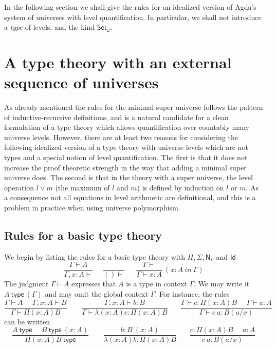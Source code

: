 \documentclass[11pt,a4paper]{article}
\newcommand{\Id}{\mathsf{Id}}
\newcommand{\type}{\mathsf{type}}
\newcommand{\N}{\mathsf{N}}
\newcommand{\Set}{\mathsf{Set}}
\begin{document}
In the following section we shall give the rules for an idealized version of Agda's system of universes with level quantification. In particular, we shall not introduce a {\em type} of levels, and the kind $\Set_\omega$. 

\section{A type theory with an external sequence of universes}

As already mentioned the rules for the minimal super universe follows the pattern of inductive-recursive definitions, and is a natural candidate for a clean formulation of a type theory which allows quantification over countably many universe levels. However, there are at least two reasons for considering the following idealized version of a type theory with universe levels which are not types and a special notion of level quantification. The first is that it does not increase the proof theoretic strength in the way that adding a minimal super universe does. The second is that in the theory with a super universe, the level operation $l \vee m$ (the maximum of $l$ and $m$) is defined by induction on $l$ or $m$. As a consequence not all equations in level arithmetic are definitional, and this is a problem in practice when using universe polymorphism.

\subsection*{Rules for a basic type theory}

We begin by listing the rules for a basic type theory with $\Pi, \Sigma, \N,$ and $\Id$
$$
\frac{\Gamma\vdash A}{\Gamma,x:A\vdash}~~~~~~\frac{}{()\vdash}~~~~~~~
\frac{\Gamma\vdash}{\Gamma\vdash x:A}~(x\!:\! A~in~\Gamma)
$$
The judgment $\Gamma\vdash A$ expresses that $A$ is a type in context $\Gamma$.
We may write it $A~\type~(\Gamma)$ and may omit the global context $\Gamma$.
For instance, the rules
$$
\frac{\Gamma\vdash A~~~~~~\Gamma,x:A\vdash B}{\Gamma\vdash \Pi (x:A) B}~~~~~~~~~
\frac{\Gamma,x:A\vdash b:B}{\Gamma\vdash \lambda (x:A) c:\Pi (x:A) B}~~~~~~~~
\frac{\Gamma\vdash c:\Pi (x:A) B~~~~~~\Gamma\vdash a:A}
     {\Gamma\vdash c~a:B(a/x)}
$$
can be written
$$
\frac{A~\type~~~~~~B~\type~(x:A)}{\Pi (x:A) B~\type}~~~~~~~~~
\frac{b:B~(x:A)}{\lambda (x:A) b:\Pi (x:A) B}~~~~~~~~
\frac{c:\Pi (x:A) B~~~~~~a:A}
     {c~a:B(a/x)}
$$
\end{document}
